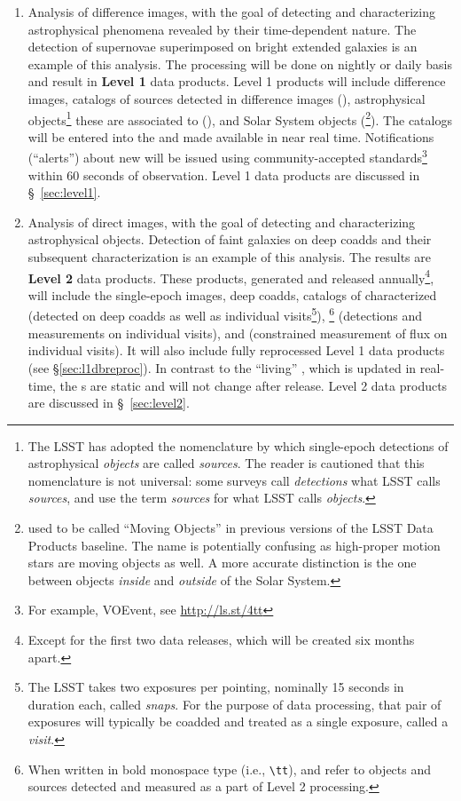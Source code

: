 \documentclass[SE,lsstdraft,toc]{lsstdoc}
\begin{document}
\begin{enumerate}
\item Analysis of difference images, with the goal of detecting and characterizing astrophysical phenomena revealed by their time-dependent nature. The detection of supernovae superimposed on bright extended galaxies is an example of this analysis. The processing will be done on nightly or daily basis and result in \textbf{Level 1} data products. Level 1 products will include difference images, catalogs of sources detected in difference images (\DIASources), astrophysical objects\footnote{The LSST has adopted the nomenclature by which single-epoch detections of astrophysical \emph{objects} are called \emph{sources}. The reader is cautioned that this nomenclature is not universal: some surveys call \emph{detections} what LSST calls \emph{sources}, and use the term \emph{sources} for what LSST calls \emph{objects}.} these are associated to (\DIAObjects), and Solar System objects (\SSObjects\footnote{\SSObjects used to be called ``Moving Objects'' in previous versions of the LSST Data Products baseline. The name is potentially confusing as high-proper motion stars are moving objects as well. A more accurate distinction is the one between objects \emph{inside} and \emph{outside} of the Solar System.}). The catalogs will be entered into the \textbf{\DB} and made available in near real time. Notifications (``alerts'') about new \DIASources will be issued using community-accepted
standards\footnote{For example, VOEvent, see \url{http://ls.st/4tt}} within 60 seconds of observation. Level 1 data products are discussed in \S~\ref{sec:level1}.

\item Analysis of direct images, with the goal of detecting and characterizing astrophysical objects. Detection of faint galaxies on deep coadds and their subsequent characterization is an example of this analysis. The results are \textbf{Level 2} data products. These products, generated and released annually\footnote{Except for the first two data releases, which will be created six months apart.}, will include the single-epoch images, deep coadds, catalogs of characterized \Objects (detected on deep coadds as well as individual visits\footnote{The LSST takes two exposures per pointing, nominally 15 seconds in duration each, called \emph{snaps}. For the purpose of data processing, that pair of exposures will typically be coadded and treated as a single exposure, called a \emph{visit}.}), \Sources\footnote{When written in bold monospace type (i.e., \texttt{\textbackslash{}tt}), \Objects and \Sources refer to objects and sources detected and measured as a part of Level 2 processing.} (detections and measurements on individual visits), and \ForcedSources (constrained measurement of flux on individual visits). It will also include fully reprocessed Level 1 data products (see \S \ref{sec:l1dbreproc}). In contrast to the ``living'' \DB, which is updated in real-time, the \DR{}s are static and will not change after release. Level 2 data products are discussed in \S~\ref{sec:level2}.
\end{enumerate}
\end{document}
